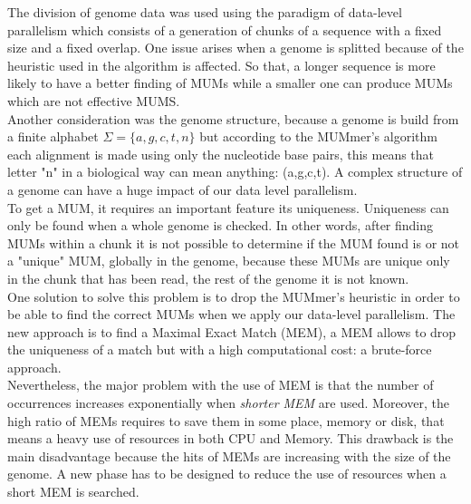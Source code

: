 \documentclass[twocolumn,twoside]{Jornadas}
\begin{document}
The division of genome data was used using the paradigm of data-level parallelism which consists of a generation of chunks of a sequence with a fixed size and a fixed overlap. One issue arises when a genome is splitted because of the heuristic used in the algorithm is affected. So that, a longer sequence is more likely to have a better finding of MUMs while a smaller one can produce MUMs which are not effective MUMS.\\
Another consideration was the genome structure, because a genome is build from a finite alphabet $\Sigma=\{a,g,c,t,n\}$ but according to the MUMmer's algorithm each alignment is made using only the nucleotide base pairs, this means that letter "n" in a biological way can mean anything: (a,g,c,t). A complex structure of a genome can have a huge impact of our data level parallelism.\\
To get a MUM, it requires an important feature its uniqueness. 
Uniqueness can only be found when a whole genome is checked.
In other words, after finding MUMs within a chunk it is not possible to determine if the MUM found is or not a "unique" MUM, globally in the genome,  because these MUMs are unique only in the chunk that has been read, the rest of the genome it is not known.\\
One solution to solve this problem is to drop the MUMmer's heuristic in order to be able to find the correct MUMs when we apply our data-level parallelism. The new approach is to find a Maximal Exact Match (MEM), a MEM allows to drop the uniqueness of a match but with a high computational cost: a brute-force approach.\\
Nevertheless, the major problem with the use of MEM is that the number of occurrences increases exponentially when \emph{shorter MEM} are used. Moreover, the high ratio of MEMs requires to save them in some place, memory or disk, that means a heavy use of resources in both CPU and Memory. This drawback is the main disadvantage because the hits of MEMs are increasing with the size of the genome. A new phase has to be designed to reduce the use of resources when a short MEM is searched.
\end{document}
